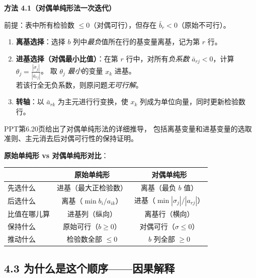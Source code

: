 \begin{defbox}
\textbf{方法 4.1（对偶单纯形法一次迭代）}

前提：表中所有检验数 $\le 0$（对偶可行），但存在 $\bar{b}_r < 0$（原始不可行）。

\begin{enumerate}
  \item \textbf{离基选择}：选择 $b$ 列中\emph{最负}值所在行的基变量离基，记为第 $r$ 行。
  \item \textbf{进基选择（对偶最小比值）}：在第 $r$ 行中，对所有\emph{负系数} $\bar{a}_{rj} < 0$，计算
        $\displaystyle \theta_j = \frac{|\sigma_j|}{|\bar{a}_{rj}|}$。
        取 $\theta_j$ \emph{最小}的变量 $x_k$ 进基。\\
        若该行全无负系数，则原问题\emph{无可行解}。
  \item \textbf{转轴}：以 $\bar{a}_{rk}$ 为主元进行行变换，使 $x_k$ 列成为单位向量，同时更新检验数行。
\end{enumerate}
\end{defbox}

\medskip
PPT第6.20页给出了对偶单纯形法的详细推导，
包括离基变量和进基变量的选取准则、主元消去后对偶可行性的保持证明。
\medskip

\begin{notebox}
\textbf{原始单纯形 vs 对偶单纯形对比}：
\medskip
{\footnotesize
\setlength{\tabcolsep}{2pt}
\begin{tabular}{@{}lcc@{}}
\toprule
& \textbf{原始单纯形} & \textbf{对偶单纯形} \\
\midrule
先选什么 & 进基（最大正检验数） & 离基（最负 $b$ 值） \\
后选什么 & 离基（$\min b_i/a_{ik}$） & 进基（$\min |\sigma_j|/|a_{rj}|$） \\
比值在哪儿算 & 进基列（纵向） & 离基行（横向） \\
保持什么 & 原始可行（$b\ge 0$） & 对偶可行（$\sigma \le 0$） \\
推动什么 & 检验数全部 $\le 0$ & $b$ 列全部 $\ge 0$ \\
\bottomrule
\end{tabular}
}
\end{notebox}

\subsection{4.3 为什么是这个顺序——因果解释}

